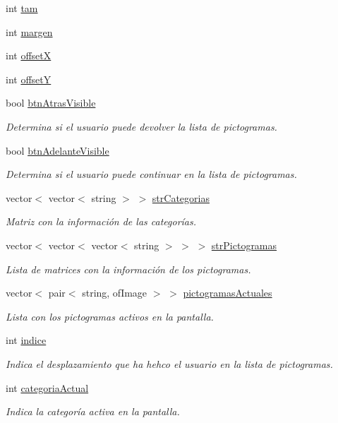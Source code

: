 \begin{DoxyCompactItemize}
int \hyperlink{classespacio_pictograma_aa59878d6a5fe1ae995756a0a283ec5ae}{tam}
\item 
int \hyperlink{classespacio_pictograma_ae9d1d84f5ddbeba53dd9aed28e7eb0d5}{margen}
\item 
int \hyperlink{classespacio_pictograma_a3e591cd8fdedbf742f55cbc2280295bc}{offset\+X}
\item 
int \hyperlink{classespacio_pictograma_a9924df4518eadddc04074ac555e7511c}{offset\+Y}
\item 
bool \hyperlink{classespacio_pictograma_ae550974a70815794e1c2a94ccc8fd99a}{btn\+Atras\+Visible}
\begin{DoxyCompactList}\small\item\em Determina si el usuario puede devolver la lista de pictogramas. \end{DoxyCompactList}\item 
bool \hyperlink{classespacio_pictograma_aecebb0c47c0d28f31052d5084e02aec2}{btn\+Adelante\+Visible}
\begin{DoxyCompactList}\small\item\em Determina si el usuario puede continuar en la lista de pictogramas. \end{DoxyCompactList}\item 
vector$<$ vector$<$ string $>$ $>$ \hyperlink{classespacio_pictograma_a90f13e054faabc1dc26f9e62fff6f572}{str\+Categorias}
\begin{DoxyCompactList}\small\item\em Matriz con la información de las categorías. \end{DoxyCompactList}\item 
vector$<$ vector$<$ vector$<$ string $>$ $>$ $>$ \hyperlink{classespacio_pictograma_af241bdf93ef686631b46fdadf07da04a}{str\+Pictogramas}
\begin{DoxyCompactList}\small\item\em Lista de matrices con la información de los pictogramas. \end{DoxyCompactList}\item 
vector$<$ pair$<$ string, of\+Image $>$ $>$ \hyperlink{classespacio_pictograma_a46e6758b5312fa89401ff012aa2d2b92}{pictogramas\+Actuales}
\begin{DoxyCompactList}\small\item\em Lista con los pictogramas activos en la pantalla. \end{DoxyCompactList}\item 
int \hyperlink{classespacio_pictograma_ac977c8f8644a1a3ab7a724c689be0038}{indice}
\begin{DoxyCompactList}\small\item\em Indica el desplazamiento que ha hehco el usuario en la lista de pictogramas. \end{DoxyCompactList}\item 
int \hyperlink{classespacio_pictograma_ae61af3d4b032f682e7e686ca0dddbfec}{categoria\+Actual}
\begin{DoxyCompactList}\small\item\em Indica la categoría activa en la pantalla. \end{DoxyCompactList}\end{DoxyCompactItemize}
